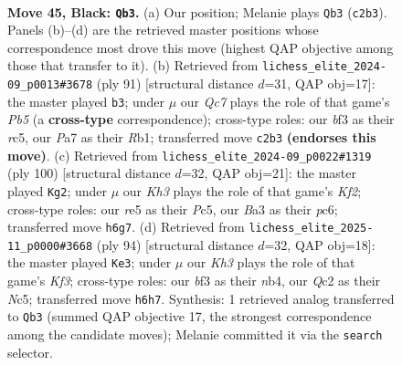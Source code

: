 \documentclass[11pt]{article}
\begin{document}
\clearpage

\begin{figure}[p]\centering
\begin{subfigure}{0.46\textwidth}\centering
\resizebox{\linewidth}{!}{%
\newchessgame
\chessboard[
  setfen={8/pp6/6pk/4R3/5P1P/b4BK1/2q5/8 b - - 3 45},
  showmover=false,
  pgfstyle=straightmove, color=movearrow, markmove={c2-b3}
]}
\caption{}
\end{subfigure}\hfill
\begin{subfigure}{0.46\textwidth}\centering
\resizebox{\linewidth}{!}{%
\newchessgame
\chessboard[
  setfen={8/8/5pk1/2R4p/1p5P/6PK/8/1r6 b - - 1 46},
  showmover=false,
  pgfstyle=straightmove, color=movearrow, markmove={b4-b3}
]}
\caption{}
\end{subfigure}
\\[4pt]
\begin{subfigure}{0.46\textwidth}\centering
\resizebox{\linewidth}{!}{%
\newchessgame
\chessboard[
  setfen={8/8/2p1bp2/2P1k1p1/8/5P1P/5K2/2B5 w - - 11 51},
  showmover=false,
  pgfstyle=straightmove, color=movearrow, markmove={f2-g2}
]}
\caption{}
\end{subfigure}\hfill
\begin{subfigure}{0.46\textwidth}\centering
\resizebox{\linewidth}{!}{%
\newchessgame
\chessboard[
  setfen={8/6p1/5k1p/2N1pb2/1n6/3P1KP1/7P/8 w - - 4 48},
  showmover=false,
  pgfstyle=straightmove, color=movearrow, markmove={f3-e3}
]}
\caption{}
\end{subfigure}
\caption{\textbf{Move 45, Black: \texttt{Qb3}.} (a) Our position; Melanie plays \texttt{Qb3} (\texttt{c2b3}). Panels (b)--(d) are the retrieved master positions whose correspondence most drove this move (highest QAP objective among those that transfer to it). (b) Retrieved from \texttt{lichess\_elite\_2024-09\_p0013\#3678} (ply 91) [structural distance $d$=31, QAP obj=17]: the master played \texttt{b3}; under $\mu$ our \emph{Qc7} plays the role of that game's \emph{Pb5} (a \textbf{cross-type} correspondence); cross-type roles: our \emph{b}f3 as their \emph{r}c5, our \emph{P}a7 as their \emph{R}b1; transferred move \texttt{c2b3} \textbf{(endorses this move)}. (c) Retrieved from \texttt{lichess\_elite\_2024-09\_p0022\#1319} (ply 100) [structural distance $d$=32, QAP obj=21]: the master played \texttt{Kg2}; under $\mu$ our \emph{Kh3} plays the role of that game's \emph{Kf2}; cross-type roles: our \emph{r}e5 as their \emph{P}c5, our \emph{B}a3 as their \emph{p}c6; transferred move \texttt{h6g7}. (d) Retrieved from \texttt{lichess\_elite\_2025-11\_p0000\#3668} (ply 94) [structural distance $d$=32, QAP obj=18]: the master played \texttt{Ke3}; under $\mu$ our \emph{Kh3} plays the role of that game's \emph{Kf3}; cross-type roles: our \emph{b}f3 as their \emph{n}b4, our \emph{Q}c2 as their \emph{N}c5; transferred move \texttt{h6h7}. Synthesis: 1 retrieved analog transferred to \texttt{Qb3} (summed QAP objective 17, the strongest correspondence among the candidate moves); Melanie committed it via the \texttt{search} selector.}
\label{fig:thought-m89}
\end{figure}
\end{document}
